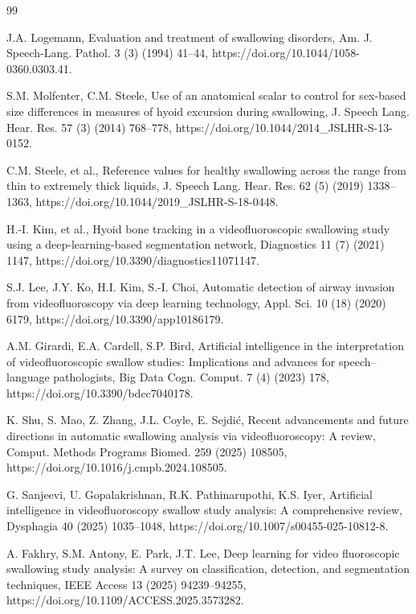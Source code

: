 \documentclass[a4paper,fleqn]{cas-dc}
\begin{document}
\begin{thebibliography}{99}

J.A. Logemann,
Evaluation and treatment of swallowing disorders,
Am. J. Speech-Lang. Pathol. 3 (3) (1994) 41--44, https://doi.org/10.1044/1058-0360.0303.41.

S.M. Molfenter, C.M. Steele,
Use of an anatomical scalar to control for sex-based size differences in measures of hyoid excursion during swallowing,
J. Speech Lang. Hear. Res. 57 (3) (2014) 768--778, https://doi.org/10.1044/2014\_JSLHR-S-13-0152.

C.M. Steele, et al.,
Reference values for healthy swallowing across the range from thin to extremely thick liquids,
J. Speech Lang. Hear. Res. 62 (5) (2019) 1338--1363, https://doi.org/10.1044/2019\_JSLHR-S-18-0448.

H.-I. Kim, et al.,
Hyoid bone tracking in a videofluoroscopic swallowing study using a deep-learning-based segmentation network,
Diagnostics 11 (7) (2021) 1147, https://doi.org/10.3390/diagnostics11071147.

S.J. Lee, J.Y. Ko, H.I. Kim, S.-I. Choi,
Automatic detection of airway invasion from videofluoroscopy via deep learning technology,
Appl. Sci. 10 (18) (2020) 6179, https://doi.org/10.3390/app10186179.

A.M. Girardi, E.A. Cardell, S.P. Bird,
Artificial intelligence in the interpretation of videofluoroscopic swallow studies: Implications and advances for speech--language pathologists,
Big Data Cogn. Comput. 7 (4) (2023) 178, https://doi.org/10.3390/bdcc7040178.

K. Shu, S. Mao, Z. Zhang, J.L. Coyle, E. Sejdi\'{c},
Recent advancements and future directions in automatic swallowing analysis via videofluoroscopy: A review,
Comput. Methods Programs Biomed. 259 (2025) 108505, https://doi.org/10.1016/j.cmpb.2024.108505.

G. Sanjeevi, U. Gopalakrishnan, R.K. Pathinarupothi, K.S. Iyer,
Artificial intelligence in videofluoroscopy swallow study analysis: A comprehensive review,
Dysphagia 40 (2025) 1035--1048, https://doi.org/10.1007/s00455-025-10812-8.

A. Fakhry, S.M. Antony, E. Park, J.T. Lee,
Deep learning for video fluoroscopic swallowing study analysis: A survey on classification, detection, and segmentation techniques,
IEEE Access 13 (2025) 94239--94255, https://doi.org/10.1109/ACCESS.2025.3573282.


\end{thebibliography}
\end{document}
